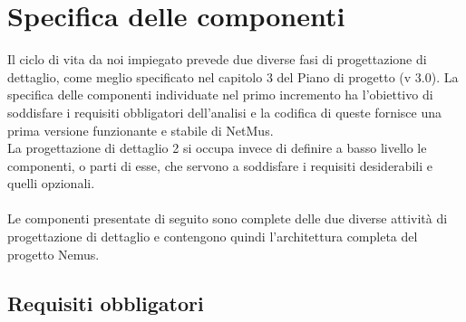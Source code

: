 \chapter{Specifica delle componenti}
\thispagestyle{fancy} %
Il ciclo di vita da noi impiegato prevede due diverse fasi di progettazione di
dettaglio, come meglio specificato nel capitolo 3 del Piano di progetto (v
3.0). La specifica delle componenti individuate nel primo incremento ha
l'obiettivo di soddisfare i requisiti obbligatori dell'analisi e la codifica di
queste fornisce una prima versione funzionante e stabile di NetMus. \\
La progettazione di dettaglio 2 si occupa invece di definire a basso livello le
componenti, o parti di esse, che servono a soddisfare i requisiti desiderabili e
quelli opzionali.\\\\
Le componenti presentate di seguito sono complete delle due diverse attivit\`a
di progettazione di dettaglio e contengono quindi l'architettura completa del
progetto Nemus. \section*{Requisiti obbligatori}
